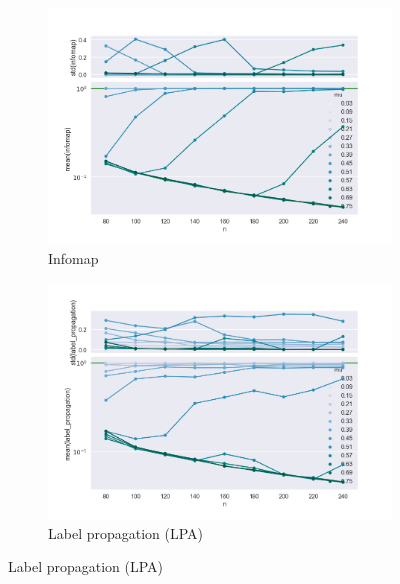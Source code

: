 \begin{figure}
    \begin{subfigure}[b]{0.32\textwidth}
        \includegraphics[width=\textwidth]{fig/ratio_vs_n_infomap}
        \caption{Infomap}
        \label{fig:mouse}
    \end{subfigure}
    \qquad
    \begin{subfigure}[b]{0.32\textwidth}
        \includegraphics[width=\textwidth]{fig/ratio_vs_n_label_propagation}
        \caption{Label propagation (LPA)}
        \label{fig:gull}
    \end{subfigure}
    

\end{figure}
